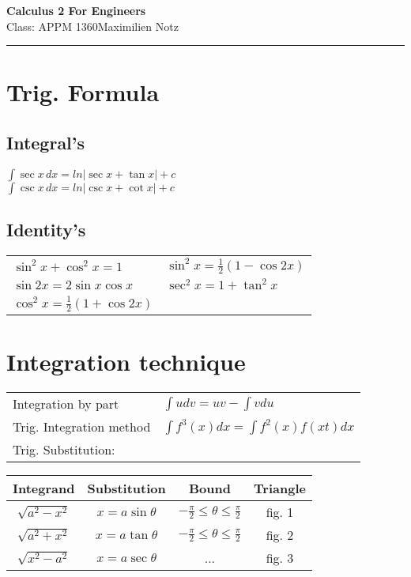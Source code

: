 \documentclass[5pt]{article}
\begin{document}
\begin{center}
     \Large{\textbf{Calculus 2 For Engineers}}\\
     \small{Class: APPM 1360}\hfill\small{\textcopyright Maximilien Notz \the\year{}}
     \noindent\rule{20.2cm}{0.4pt}
\end{center}


\begin{multicols}{2}
\setcounter{secnumdepth}{0}


\section{Trig. Formula}
\subsection{Integral's}
$\int \sec{x}\,dx=ln|\sec{x}+\tan{x}|+c$\\
$\int \csc{x}\,dx=ln|\csc{x}+\cot{x}|+c$\\
\subsection{Identity's}
\begin{tabular}{l|l}
$\sin^2{x}+\cos^2{x} = 1$ & $\sin^2{x}=\frac{1}{2}(1-\cos{2x})$\\
$\sin{2x} = 2\sin{x}\cos{x}$ & $\sec^2{x}=1+\tan^2{x}$\\
$\cos^2{x}=\frac{1}{2}(1+\cos{2x})$ & \\
\end{tabular}




\section{Integration technique}
\begin{tabular}{ll}
    Integration by part & $\int udv=uv-\int vdu$\\
    Trig. Integration method & $\int f^3(x)dx=\int f^2(x)f(xt)dx$\\
    Trig. Substitution:   & \\
\end{tabular}
    
\begin{tabular}{c|c|c|c}
    Integrand & Substitution & Bound & Triangle\\
    \hline
    $\sqrt{a^2-x^2}$ & $x=a\sin{\theta}$ & $-\frac{\pi}{2}\le\theta\le\frac{\pi}{2}$ & fig. 1\\
    $\sqrt{a^2+x^2}$ & $x=a\tan{\theta}$ & $-\frac{\pi}{2}\le\theta\le\frac{\pi}{2}$ & fig. 2\\
    $\sqrt{x^2-a^2}$ & $x=a\sec{\theta}$ & ... & fig. 3\\
\end{tabular}


\end{multicols}
\end{document}

